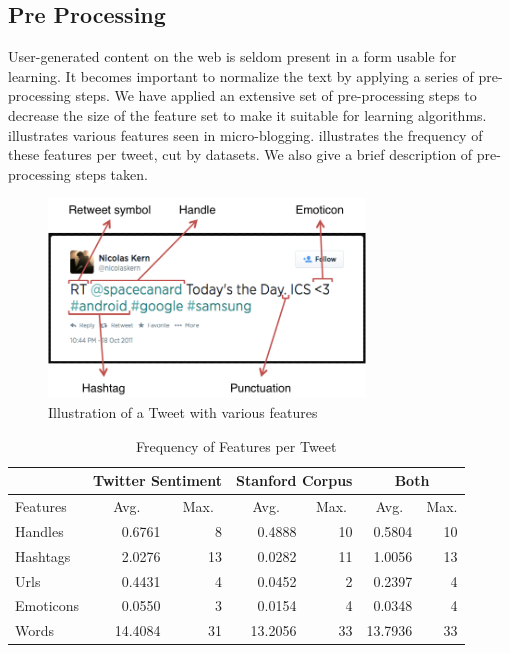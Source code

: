 \subsection{Pre Processing} User-generated content on the web is seldom present
in a form usable for learning. It becomes important to normalize the text by
applying a series of pre-processing steps. We have applied an extensive set of
pre-processing steps to decrease the size of the feature set to make it suitable
for learning algorithms.  illustrates various
features seen in micro-blogging.  illustrates the frequency of these
features per tweet, cut by datasets. We also give a brief description of pre-processing steps taken.

\begin{figure}[h!]
\centering
\includegraphics[width=0.75\textwidth]{img/tweet.png}
\caption{Illustration of a Tweet with various features}
\label{fig:tweet}
\end{figure}

\begin{table}[h!]
\centering

\begin{tabular}{|l|rr|rr|rr|}
\hline
 & \multicolumn{2}{c|}{Twitter Sentiment}
 & \multicolumn{2}{c|}{Stanford Corpus}
 & \multicolumn{2}{c|}{Both} \\\hline
Features	& \multicolumn{1}{c}{Avg.} & \multicolumn{1}{c|}{Max.}
			& \multicolumn{1}{c}{Avg.} & \multicolumn{1}{c|}{Max.}
			& \multicolumn{1}{c}{Avg.} & \multicolumn{1}{c|}{Max.} \\\hline
Handles		&  0.6761 &  8 &  0.4888 & 10 &  0.5804 & 10 \\
Hashtags	&  2.0276 & 13 &  0.0282 & 11 &  1.0056 & 13 \\
Urls		&  0.4431 &  4 &  0.0452 &  2 &  0.2397 &  4 \\
Emoticons	&  0.0550 &  3 &  0.0154 &  4 &  0.0348 &  4 \\
Words		& 14.4084 & 31 & 13.2056 & 33 & 13.7936 & 33 \\\hline

\end{tabular}

\caption{Frequency of Features per Tweet}
\label{tab:feat_freq}
\end{table}

